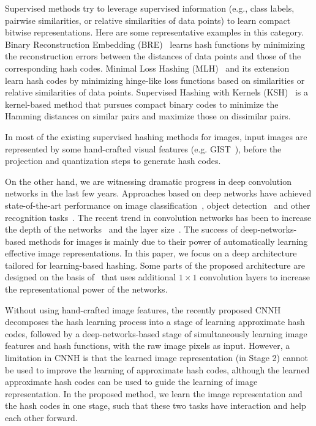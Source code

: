 \documentclass[10pt,twocolumn,letterpaper]{article}
\begin{document}
Supervised methods try to leverage supervised information (e.g., class labels, pairwise similarities, or relative similarities of data points) to learn compact bitwise representations. Here are some representative examples in this category. Binary Reconstruction Embedding (BRE)~\cite{BRE} learns hash functions by minimizing the reconstruction errors between the distances of data points and those of the corresponding hash codes. Minimal Loss Hashing
(MLH)~\cite{MLH} and its extension~\cite{triplet} learn hash codes by minimizing hinge-like loss functions based on similarities or relative similarities of data points. Supervised Hashing with Kernels
(KSH)~\cite{KSH} is a kernel-based method that pursues compact binary codes to minimize the Hamming distances on similar pairs and maximize those on dissimilar pairs.

In most of the existing supervised hashing methods for images, input images are represented by some hand-crafted visual features (e.g. GIST~\cite{GIST}), before the projection and quantization steps to generate hash codes.

On the other hand, we are witnessing dramatic progress in deep convolution networks in the last few years. Approaches based on deep networks have achieved state-of-the-art performance on image classification~\cite{AlexNet,VGG,GoogleLeNet}, object detection~\cite{AlexNet,GoogleLeNet} and other recognition tasks~\cite{DeepFace}. The recent trend in convolution networks has been to increase the depth of the networks~\cite{NIN,VGG,GoogleLeNet} and the layer size~\cite{Overfeat,GoogleLeNet}. The success of deep-networks-based methods for images is mainly due to their power of automatically learning effective image representations. In this paper, we focus on a deep architecture tailored for learning-based hashing. Some parts of the proposed architecture are designed on the basis of~\cite{NIN} that uses additional $1\times 1$ convolution layers to increase the representational power of the networks.

 Without using hand-crafted image features, the recently proposed CNNH~\cite{CNNH} decomposes the hash learning process into a stage of learning approximate hash codes, followed by a deep-networks-based stage of simultaneously learning image features and hash functions, with the raw image pixels as input. However, a limitation in CNNH is that the learned image representation (in Stage 2) cannot be used to improve the learning of approximate hash codes, although the learned approximate hash codes can be used to guide the learning of image representation. In the proposed method, we learn the image representation and the hash codes in one stage, such that these two tasks have interaction and help each other forward.
\end{document}
